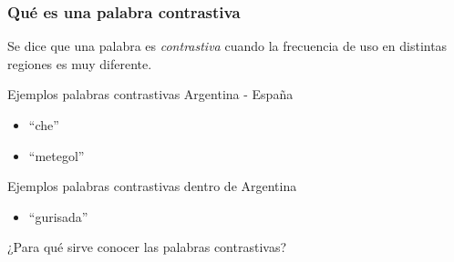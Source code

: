
\begin{frame}[t]\frametitle{Qué es una palabra contrastiva}
    
    Se dice que una palabra es \textit{contrastiva} cuando la frecuencia de uso en distintas regiones es muy diferente. 

    \begin{block}{Ejemplos palabras contrastivas Argentina - España}
    \begin{itemize}
        \item ``che''
        \item ``metegol''
    \end{itemize}
    \end{block}

    \begin{block}{Ejemplos palabras contrastivas dentro de Argentina}
    \begin{itemize}
        \item ``gurisada''
    \end{itemize}
    \end{block}

    ¿Para qué sirve conocer las palabras contrastivas?

\end{frame}

